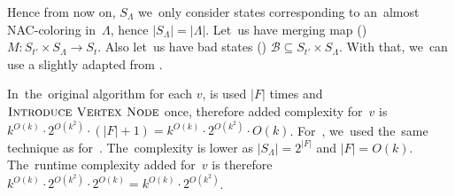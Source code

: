 Hence from now on, \( S_\Lambda \) we~only consider states corresponding to
an~almost NAC-coloring in~\( \Lambda \), hence \( |S_\Lambda| = |\Lambda| \).
%
Let~us have%
merging map ()
\( M : S_{t'} \times S_\Lambda \to S_t \).
Also let~us have bad states ()
\( \mathcal{B} \subseteq S_{t'} \times S_\Lambda \).
%
With that, we~can use a slightly adapted 
from \JoinNode{}.


In~the~original algorithm for each \( v \),
\IntroduceEdgeNode{} is used \( |F| \) times
and \( \textsc{Introduce Vertex Node}{} \) once, therefore added complexity for~\( v \)
is \( {k}^{O(k)} \cdot 2^{O(k^2)} \cdot (|F| + 1) = {k}^{O(k)} \cdot 2^{O(k^2)} \cdot O(k) \).
%
For~\IntroduceVertexWithEdgesNode{},
we~used the~same technique as for~\JoinNode{}.
The~complexity is lower as \( |S_\Lambda| = 2^{|F|} \) and \( |F| = O(k) \).
The~runtime complexity added for~\( v \) is therefore
\( {k}^{O(k)} \cdot 2^{O(k^2)} \cdot 2^{O(k)} = {k}^{O(k)} \cdot 2^{O(k^2)}\).

